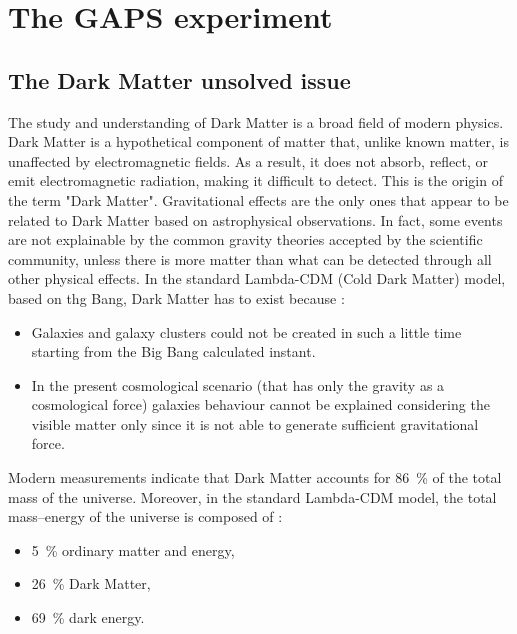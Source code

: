 \chapter{The GAPS experiment} \label{appendixGAPSintro}


\section{The Dark Matter unsolved issue} \label{appendixGAPSdarkmatter}
The study and understanding of Dark Matter is a broad field of modern physics. Dark Matter is a hypothetical component of matter that, unlike known matter, is unaffected by electromagnetic fields. As a result, it does not absorb, reflect, or emit electromagnetic radiation, making it difficult to detect. This is the origin of the term "Dark Matter". Gravitational effects are the only ones that appear to be related to Dark Matter based on astrophysical observations. In fact, some events are not explainable by the common gravity theories accepted by the scientific community, unless there is more matter than what can be detected through all other physical effects. In the standard Lambda-CDM (Cold Dark Matter) model, based on thg Bang, Dark Matter has to exist because \cite{aramaki_2016_review}:

\begin{itemize}
    \itemsep0em
    \item Galaxies and galaxy clusters could not be created in such a little time starting from the Big Bang calculated instant.
    \item In the present cosmological scenario (that has only the gravity as a cosmological force) galaxies behaviour cannot be explained considering the visible matter only since it is not able to generate sufficient gravitational force.
\end{itemize}

Modern measurements indicate that Dark Matter accounts for \SI{86}{\percent} of the total mass of the universe. Moreover, in the standard Lambda-CDM model, the total mass–energy of the universe is composed of \cite{feng_2010_dark}:

\begin{itemize}
    \itemsep0em
    \item \SI{5}{\percent} ordinary matter and energy,
    \item \SI{26}{\percent} Dark Matter,
    \item \SI{69}{\percent} dark energy.
\end{itemize}

